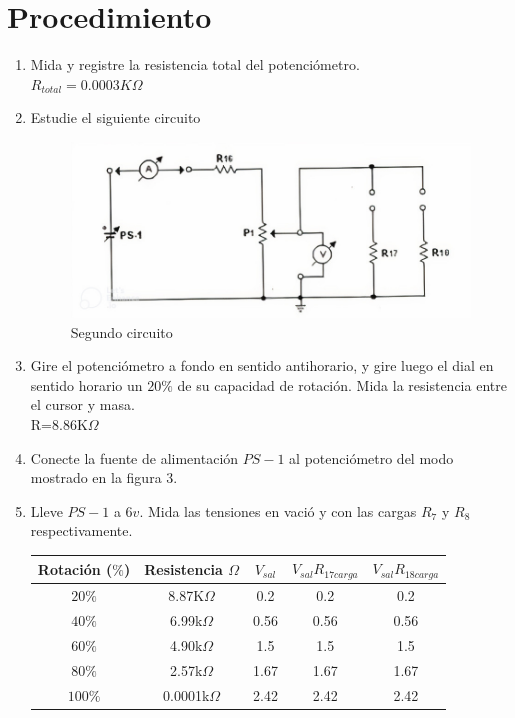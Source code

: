 \section{Procedimiento}
\begin{enumerate}
	\item Mida y registre la resistencia total del potenciómetro.
	\\ $R_{total}= 0.0003K\Omega$
	\item Estudie el siguiente circuito
	
	\begin{figure}[h]
		\centering
		\includegraphics[scale=0.30]{imagenes/2}
		\caption{Segundo circuito}
	\end{figure}
	\item Gire el potenciómetro a fondo en sentido antihorario, y gire luego el dial en sentido horario un $20\%$ de su capacidad de rotación. Mida la resistencia entre el cursor y masa.
	\\ R=8.86K$\Omega$
	\item Conecte la fuente de alimentación $PS-1$ al potenciómetro del modo mostrado en la figura 3.
	\item Lleve  $PS-1$ a $6v$. Mida las tensiones en vació y con las cargas $R_{7}$ y $R_{8}$ respectivamente.
	\begin{table}[h]
		\centering
		\begin{tabular}{|c|c|c|c|c|}
			\hline
			\textbf{Rotación ($\%$)}&\textbf{Resistencia $\Omega$}&\textbf{$V_{sal}$}&\textbf{$V_{sal} R_{17 carga}$}&\textbf{$V_{sal} R_{18 carga}$}\\
			\hline 
			$20\%$&8.87K$\Omega$&0.2&0.2&0.2\\ 
			\hline 
			$40\%$&6.99k$\Omega$&0.56&0.56&0.56\\ 
			\hline
			$60\%$&4.90k$\Omega$&1.5&1.5&1.5\\ 
			\hline
			$80\%$&2.57k$\Omega$&1.67&1.67&1.67\\ 
			\hline
			$100\%$&0.0001k$\Omega$&2.42&2.42&2.42\\ 

\end{tabular}
\end{table}
\end{enumerate}
